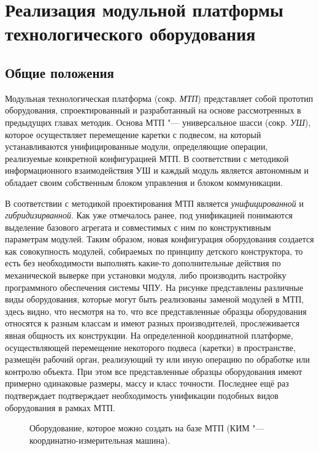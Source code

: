 \chapter{Реализация модульной платформы технологического оборудования}\label{ch:ch4}

\section{Общие положения}

Модульная технологическая платформа (сокр. \textit{МТП}) представляет собой прототип оборудования, спроектированный и разработанный на основе рассмотренных в предыдущих главах методик. Основа МТП "--- универсальное шасси (сокр. \textit{УШ}), которое осуществляет перемещение каретки с подвесом, на который устанавливаются унифицированные модули, определяющие операции, реализуемые конкретной конфигурацией МТП. В соответствии с  методикой информационного взаимодействия УШ и каждый модуль является автономным и обладает своим собственным блоком управления и блоком коммуникации.

В соответствии с методикой проектирования МТП является \textit{унифицированной} и \textit{гибридизирванной}. Как уже отмечалось ранее, под унификацией понимаются выделение базового агрегата и совместимых с ним по конструктивным параметрам модулей. Таким образом, новая конфигурация оборудования создается как совокупность модулей, собираемых по принципу детского конструктора, то есть без необходимости выполнять какие-то дополнительные действия по механической выверке при установки модуля, либо производить настройку программного обеспечения системы ЧПУ. На рисунке представлены различные виды оборудования, которые могут быть реализованы заменой модулей в МТП, здесь видно, что несмотря на то, что все представленные образцы оборудования относятся к разным классам и имеют разных производителей, прослеживается явная общность их конструкции. На определенной координатной платформе, осуществляющей перемещение некоторого подвеса (каретки) в пространстве, размещён рабочий орган, реализующий ту или иную операцию по обработке или контролю объекта. При этом все представленные образцы оборудования имеют примерно одинаковые размеры, массу и класс точности. Последнее ещё раз подтверждает подтверждает необходимость унификации подобных видов оборудования в рамках МТП.

\begin{figure}[ht]
	\caption[Оборудование, которое можно создать на базе МТП]{Оборудование, которое можно создать на базе МТП (КИМ "--- координатно-измерительная машина).}\label{fig:equip-types}
\end{figure}

